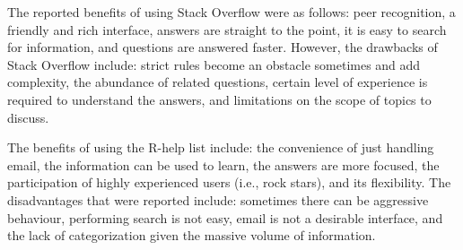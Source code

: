 \documentclass{sig-alternate-05-2015}
\begin{document}
	The reported benefits of using Stack Overflow were as follows: peer recognition, a friendly and rich interface, answers are straight to the point, it is easy to search for information, and questions are answered faster.
	However, the drawbacks of Stack Overflow include: strict rules become an obstacle sometimes and add complexity, the abundance of related questions, certain level of experience is required to understand the answers, and limitations on the scope of topics to discuss.

	The benefits of using the R-help list include: the convenience of just handling email, the information can be used to learn, the answers are more focused, the participation of highly experienced users (i.e., rock stars), and its flexibility.
	The disadvantages that were reported include: sometimes there can be aggressive behaviour, performing search is not easy, email is not a desirable interface, and the lack of categorization given the massive volume of information.
\end{document}
